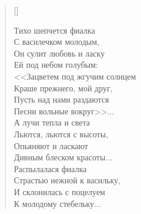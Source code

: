 \newpage
\vspace*{0cm}


\settowidth{\versewidth}{<<Зацветем под жгучим солнцем}
\begin{verse}[\versewidth]
\begin{altverse}
Тихо шепчется фиалка\\
    С василечком молодым,\\
Он сулит любовь и ласку\\
    Ей под небом голубым:\\
<<Зацветем под жгучим солнцем\\
    Краше прежнего, мой друг,\\
Пусть над нами раздаются\\
    Песни вольные вокруг>>...\\
А лучи тепла и света\\
    Льются, льются с высоты,\\
Опьяняют и ласкают\\
    Дивным блеском красоты...\\
Распылалася фиалка\\
    Страстью нежной к васильку,\\
И склонилась с поцелуем\\
    К молодому стебельку...\\
\end{altverse}
\end{verse}


\newpage
\vspace*{0cm}


